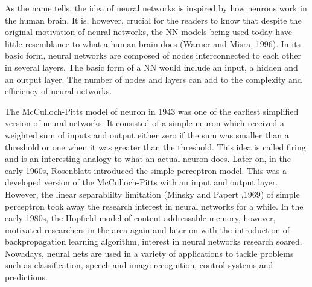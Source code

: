 As the name tells, the idea of neural networks is inspired by how neurons work in the human brain. It is, however, crucial for the readers to know that despite the original motivation of neural networks, the NN models being used today have little resemblance to what a human brain does (Warner and Misra, 1996).  In its basic form, neural networks are composed of nodes interconnected to each other in several layers. The basic form of a NN would include an input, a hidden and an output layer. The number of nodes and layers can add to the complexity and efficiency of neural networks.  

The McCulloch-Pitts model of neuron in 1943 was one of the earliest simplified version of neural networks. It consisted of a simple neuron which received a weighted sum of inputs and output either zero if the sum was smaller than a threshold or one when it was greater than the threshold. This idea is called firing and is an interesting analogy to what an actual neuron does. Later on, in the early 1960s, Rosenblatt introduced the simple perceptron model. This was a developed version of the McCulloch-Pitts with an input and output layer. However, the linear separablilty limitation (Minsky and Papert ,1969) of simple perceptron took away the research interest in neural networks for a while. In the early 1980s, the Hopfield model of content-addressable memory, however, motivated researchers in the area again and later on with the introduction of backpropagation learning algorithm, interest in neural networks research soared. Nowadays, neural nets are used in a variety of applications to tackle problems such as classification, speech and image recognition, control systems and predictions.
